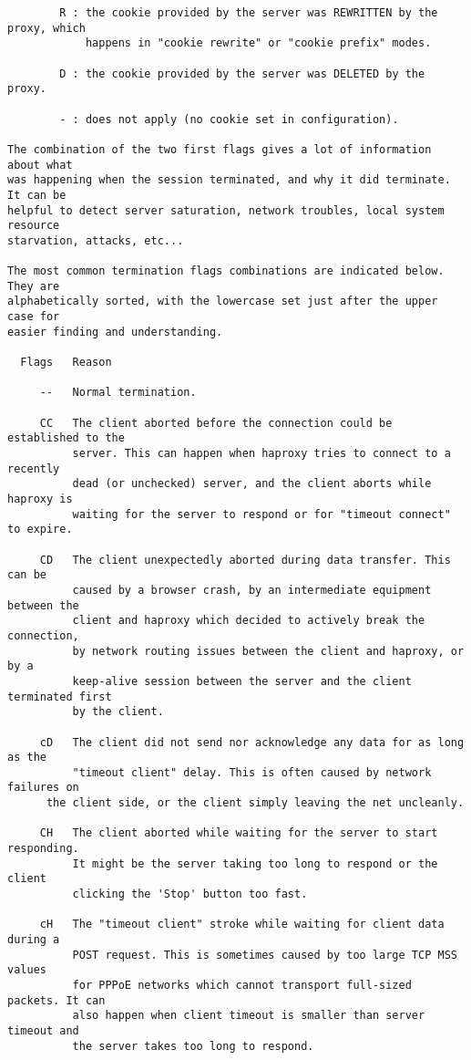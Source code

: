 \begin{verbatim}
        R : the cookie provided by the server was REWRITTEN by the proxy, which
            happens in "cookie rewrite" or "cookie prefix" modes.

        D : the cookie provided by the server was DELETED by the proxy.

        - : does not apply (no cookie set in configuration).

The combination of the two first flags gives a lot of information about what
was happening when the session terminated, and why it did terminate. It can be
helpful to detect server saturation, network troubles, local system resource
starvation, attacks, etc...

The most common termination flags combinations are indicated below. They are
alphabetically sorted, with the lowercase set just after the upper case for
easier finding and understanding.

  Flags   Reason

     --   Normal termination.

     CC   The client aborted before the connection could be established to the
          server. This can happen when haproxy tries to connect to a recently
          dead (or unchecked) server, and the client aborts while haproxy is
          waiting for the server to respond or for "timeout connect" to expire.

     CD   The client unexpectedly aborted during data transfer. This can be
          caused by a browser crash, by an intermediate equipment between the
          client and haproxy which decided to actively break the connection,
          by network routing issues between the client and haproxy, or by a
          keep-alive session between the server and the client terminated first
          by the client.

     cD   The client did not send nor acknowledge any data for as long as the
          "timeout client" delay. This is often caused by network failures on
	  the client side, or the client simply leaving the net uncleanly.

     CH   The client aborted while waiting for the server to start responding.
          It might be the server taking too long to respond or the client
          clicking the 'Stop' button too fast.

     cH   The "timeout client" stroke while waiting for client data during a
          POST request. This is sometimes caused by too large TCP MSS values
          for PPPoE networks which cannot transport full-sized packets. It can
          also happen when client timeout is smaller than server timeout and
          the server takes too long to respond.


\end{verbatim}
